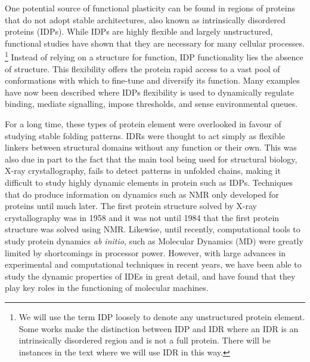 One potential source of functional plasticity can be found in regions of proteins that do not adopt stable architectures, also known as intrinsically disordered proteins (IDPs). While IDPs are highly flexible and largely unstructured, functional studies have shown that they are necessary for many cellular processes.  \footnote{We will use the term IDP loosely to denote any unstructured protein element. Some works make the distinction between IDP and IDR where an IDR is an intrinsically disordered region and is not a full protein. There will be instances in the text where we will use IDR in this way.} Instead of relying on a structure for function, IDP functionality lies the absence of structure. This flexibility offers the protein rapid access to a vast pool of conformations with which to fine-tune and diversify its function. Many examples have now been described where IDPs flexibility is used to dynamically regulate binding, mediate signalling, impose thresholds, and sense environmental queues. 


For a long time, these types of protein element were overlooked in favour of studying stable folding patterns. IDRs were thought to act simply as flexible linkers between structural domains without any  function or their own. This was also due in part to the fact that the main tool being used for structural biology, X-ray crystallography, fails to detect patterns in unfolded chains, making it difficult to study highly dynamic elements in protein such as IDPs. Techniques that do produce information on dynamics such as NMR only developed for proteins until much later. The first protein structure solved by X-ray crystallography was in 1958 and it was not until 1984 that the first protein structure was solved using NMR. Likewise, until recently, computational tools to study protein dynamics {\it ab initio}, such as Molecular Dynamics (MD) were greatly limited by shortcomings in processor power. However, with large advances in experimental and computational techniques in recent years, we have been able to study the dynamic properties of IDEs in great detail, and have found that they play key roles in the functioning of molecular machines. 


